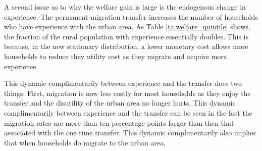 \documentclass[pdftex,11pt]{article}
\begin{document}
A second issue as to why the welfare gain is large is the endogenous change in experience. The permanent migration transfer increases the number of households who have experience with the urban area. As Table \ref{ta:welfare_quintile} shows, the fraction of the rural population with experience essentially doubles. This is because, in the new stationary distribution, a lower monetary cost allows more households to reduce they utility cost as they migrate and acquire more experience. 

This dynamic complimentarily between experience and the transfer does two things. First, migration is now less costly for most households as they enjoy the transfer and the disutility of the urban area no longer hurts. This dynamic complimentarily between experience and the transfer can be seen in the fact the migration rates are more than ten percentage points larger than then that associated with the one time transfer. This dynamic complimentarily also implies that when households do migrate to the urban area,




\newpage
\end{document}
